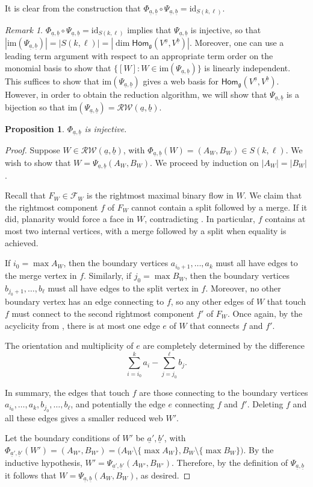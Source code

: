 \documentclass[11pt,a4paper,reqno]{amsart}
\newcommand{\g}{\mathfrak{g}}
\renewcommand{\o}{\circ}
\renewcommand{\a}{\alpha}
\renewcommand{\b}{\mathfrak{b}}
\numberwithin{equation}{section}
\renewcommand{\hom}{\mathsf{Hom}}
\renewcommand{\a}{\underline a}
\renewcommand{\b}{\underline b}
\newcommand{\RW}{\mathcal{RW}}
\newtheorem{proposition}[thm]{Proposition}
\theoremstyle{definition}
\theoremstyle{remark}
\newtheorem{remark}[thm]{Remark}
\begin{document}
It is clear from the construction that $\Phi_{\a,\b}\o \Psi_{\a,\b} = \mathrm{id}_{S(k,\ell)}$.

\begin{remark}
    $\Phi_{\a,\b}\o\Psi_{\a,\b} = \mathrm{id}_{S(k,\ell)}$ implies that $\Psi_{\a,\b}$ is injective, so that $|\mathrm{im}(\Psi_{\a,\b})| = |S(k,\ell)| = |\dim\hom_{\g}(V^{\a},V^{\b})|$. Moreover, one can use a leading term argument with respect to an appropriate term order on the monomial basis to show that $\{[W]: W\in \mathrm{im}(\Psi_{\a,\b})\}$ is linearly independent. This suffices to show that $\mathrm{im}(\Psi_{\a,\b})$ gives a web basis for $\hom_\g(V^{\a}, V^{\b})$. However, in order to obtain the reduction algorithm, we will show that $\Psi_{\a,\b}$ is a bijection so that $\mathrm{im}(\Psi_{\a,\b}) = \RW(\a,\b)$.
\end{remark}

\begin{proposition}
    $\Phi_{\a, \b}$ is injective.
\end{proposition}

\begin{proof}
Suppose $W\in \RW(\a,\b)$, with $\Phi_{\a,\b}(W) = (A_W, B_W)\in S(k,\ell)$. We wish to show that $W = \Psi_{\a,\b}(A_W, B_W)$. We proceed by induction on $|A_W| = |B_W|$. 
    
    Recall that $F_W\in \mathcal{F}_W$ is the rightmost maximal binary flow in $W$. We claim that the rightmost component $f$ of $F_W$ cannot contain a split followed by a merge. If it did, planarity would force a face in $W$, contradicting . In particular, $f$ contains at most two internal vertices, with a merge followed by a split when equality is achieved. 
    
    If $i_0 = \max A_W$, then the boundary vertices $a_{i_0+1},\dots, a_k$ must all have edges to the merge vertex in $f$. Similarly, if $j_0=\max B_W$, then the boundary vertices $b_{j_0+1},\dots, b_\ell$ must all have edges to the split vertex in $f$. Moreover, no other boundary vertex has an edge connecting to $f$, so any other edges of $W$ that touch $f$ must connect to the second rightmost component $f'$ of $F_W$. Once again, by the acyclicity from , there is at most one edge $e$ of $W$ that connects $f$ and $f'$.

    The orientation and multiplicity of $e$ are completely determined by the difference
    \[\sum_{i=i_0}^k a_i - \sum_{j=j_0}^\ell b_j.\]

    In summary, the edges that touch $f$ are those connecting to the boundary vertices $a_{i_0},\dots, a_k, b_{j_0},\dots, b_\ell$, and potentially the edge $e$ connecting $f$ and $f'$. Deleting $f$ and all these edges gives a smaller reduced web $W'$.
    
    Let the boundary conditions of $W'$ be $\a',\b'$, with $\Phi_{\a',\b'}(W') = (A_{W'}, B_{W'}) = \big(A_W\setminus \{\max A_W\}, B_W\setminus \{\max B_W\}\big)$. By the inductive hypothesis, $W' = \Psi_{\a',\b'}(A_{W'}, B_{W'})$. Therefore, by the definition of $\Psi_{\a, \b}$ it follows that $W = \Psi_{\a,\b}(A_W, B_W)$, as desired.  
\end{proof}
\end{document}
